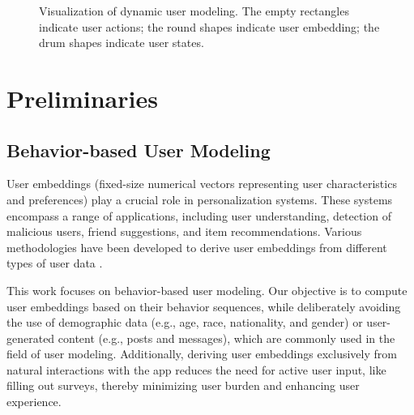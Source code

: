 \documentclass{article}
\begin{document}
\begin{figure}[t]
    \centering
    \caption{Visualization of dynamic user modeling. 
    The empty rectangles indicate user actions; the round shapes indicate user embedding; the drum shapes indicate user states.}
    \label{fig:embedding}
\end{figure}


\section{Preliminaries}

\subsection{Behavior-based User Modeling} 

User embeddings (fixed-size numerical vectors representing user characteristics and preferences) play a crucial role in personalization systems. These systems encompass a range of applications, including user understanding, detection of malicious users, friend suggestions, and item recommendations. Various methodologies have been developed to derive user embeddings from different types of user data \citep{modell_graph_2021, fan2019graph,waller_generalists_2019,zheng2017joint,liu2010personalized}.

This work focuses on behavior-based user modeling. Our objective is to compute user embeddings based on their behavior sequences, while deliberately avoiding the use of demographic data (e.g., age, race, nationality, and gender) or user-generated content (e.g., posts and messages), which are commonly used in the field of user modeling. 
Additionally, deriving user embeddings exclusively from natural interactions with the app reduces the need for active user input, like filling out surveys, thereby minimizing user burden and enhancing user experience.
\end{document}
